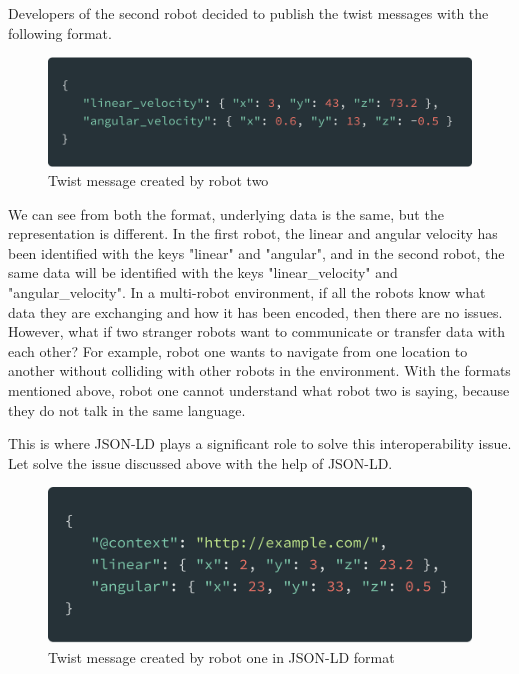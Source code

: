 		Developers of the second robot decided to publish the twist messages with the following format.
	
		\begin{figure}[!htbp] 
			\begin{center}
				\includegraphics[scale=0.1]{./images/png/jsonld/2}	
				\caption{Twist message created by robot two}	
				\label{fig:jsonld_2}	
			\end{center}
		\end{figure}
	
		We can see from both the format, underlying data is the same, but the representation is different. In the first robot, the linear and angular velocity has been identified with the keys "linear" and "angular", and in the second robot, the same data will be identified with the keys "linear\_velocity" and "angular\_velocity". In a multi-robot environment, if all the robots know what data they are exchanging and how it has been encoded, then there are no issues. However, what if two stranger robots want to communicate or transfer data with each other? For example, robot one wants to navigate from one location to another without colliding with other robots in the environment. With the formats mentioned above, robot one cannot understand what robot two is saying, because they do not talk in the same language.
		
		This is where JSON-LD plays a significant role to solve this interoperability issue. Let solve the issue discussed above with the help of JSON-LD.
		
		\begin{figure}[!htbp] 
			\begin{center}
				\includegraphics[scale=0.1]{./images/png/jsonld/3}	
				\caption{Twist message created by robot one in JSON-LD format}	
				\label{fig:jsonld_3}	
			\end{center}
		\end{figure}
	
